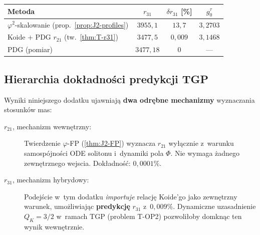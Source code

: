 \begin{remark}%
\label{rem:T-comparison}
\begin{center}\small
\begin{tabular}{@{}lccc@{}}
\toprule
Metoda & $r_{31}$ & $\delta r_{31}$ [\%] & $g_0^\tau$ \\
\midrule
$\varphi^2$-skalowanie (prop.~\ref{prop:J2-profiles})
  & $3955{,}1$ & $13{,}7$ & $3{,}2703$ \\
Koide + PDG $r_{21}$ (tw.~\ref{thm:T-r31})
  & $3477{,}5$ & $0{,}009$ & $3{,}1468$ \\
PDG (pomiar)
  & $3477{,}18$ & $0$ & --- \\
\bottomrule
\end{tabular}
\end{center}
\end{remark}

\subsection{Hierarchia dok\l{}adno\'sci predykcji TGP}%
\label{app:T-hierarchy}

\begin{remark}%
\label{rem:T-two-mechanisms}
Wyniki niniejszego dodatku ujawniaj\k{a} \textbf{dwa odr\k{e}bne
mechanizmy} wyznaczania stosunk\'ow mas:

\medskip
\begin{description}
\item[$r_{21}$, mechanizm wewn\k{e}trzny:]
  Twierdzenie $\varphi$-FP (\ref{thm:J2-FP}) wyznacza $r_{21}$
  wy\l\k{a}cznie z~warunku samosp\'ojno\'sci ODE solitonu
  i~dynamiki pola $\Phi$.
  Nie wymaga \.zadnego zewn\k{e}trznego wejscia.
  Dok\l{}adno\'s\'c: $0{,}0001\%$.

\item[$r_{31}$, mechanizm hybrydowy:]
  Podej\'scie w~tym dodatku \emph{importuje} relacj\k{e} Koide'go
  jako zewn\k{e}trzny warunek, umo\.zliwiaj\k{a}c
  \textbf{predykcj\k{e}} $r_{31}$ z~$0{,}009\%$.
  Dynamiczne uzasadnienie $Q_K = 3/2$ w~ramach TGP
  (problem T-OP2) pozwoli\l{}oby domkn\k{a}c ten wynik
  wewn\k{e}trznie.
\end{description}
\end{remark}

